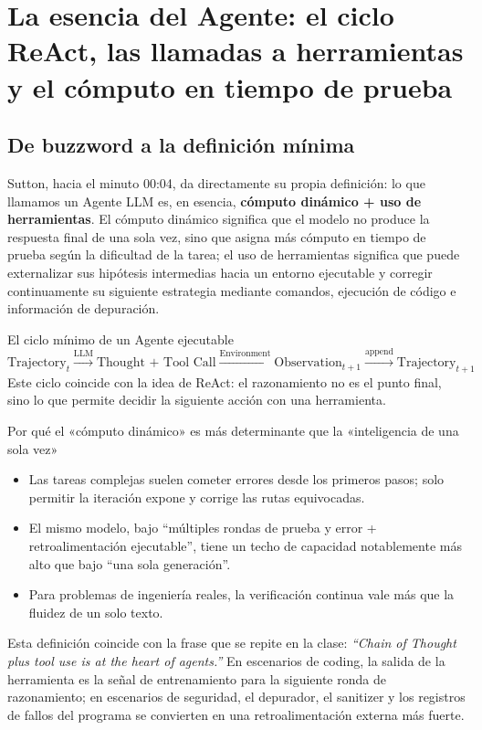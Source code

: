 \documentclass[a4paper]{article}
\begin{document}
\section{La esencia del Agente: el ciclo ReAct, las llamadas a herramientas y el cómputo en tiempo de prueba}

\subsection{De buzzword a la definición mínima}
Sutton, hacia el minuto 00:04, da directamente su propia definición: lo que llamamos un Agente LLM es, en esencia, \textbf{cómputo dinámico + uso de herramientas}. El cómputo dinámico significa que el modelo no produce la respuesta final de una sola vez, sino que asigna más cómputo en tiempo de prueba según la dificultad de la tarea; el uso de herramientas significa que puede externalizar sus hipótesis intermedias hacia un entorno ejecutable y corregir continuamente su siguiente estrategia mediante comandos, ejecución de código e información de depuración.

\begin{knowledgebox}{El ciclo mínimo de un Agente ejecutable}
\[
\text{Trajectory}_{t}
\xrightarrow{\text{LLM}}
\text{Thought + Tool Call}
\xrightarrow{\text{Environment}}
\text{Observation}_{t+1}
\xrightarrow{\text{append}}
\text{Trajectory}_{t+1}
\]
Este ciclo coincide con la idea de ReAct: el razonamiento no es el punto final, sino lo que permite decidir la siguiente acción con una herramienta.
\end{knowledgebox}

\begin{importantbox}{Por qué el «cómputo dinámico» es más determinante que la «inteligencia de una sola vez»}
\begin{itemize}
    \item Las tareas complejas suelen cometer errores desde los primeros pasos; solo permitir la iteración expone y corrige las rutas equivocadas.
    \item El mismo modelo, bajo ``múltiples rondas de prueba y error + retroalimentación ejecutable'', tiene un techo de capacidad notablemente más alto que bajo ``una sola generación''.
    \item Para problemas de ingeniería reales, la verificación continua vale más que la fluidez de un solo texto.
\end{itemize}
\end{importantbox}

Esta definición coincide con la frase que se repite en la clase: \textit{``Chain of Thought plus tool use is at the heart of agents.''} En escenarios de coding, la salida de la herramienta es la señal de entrenamiento para la siguiente ronda de razonamiento; en escenarios de seguridad, el depurador, el sanitizer y los registros de fallos del programa se convierten en una retroalimentación externa más fuerte.
\end{document}
